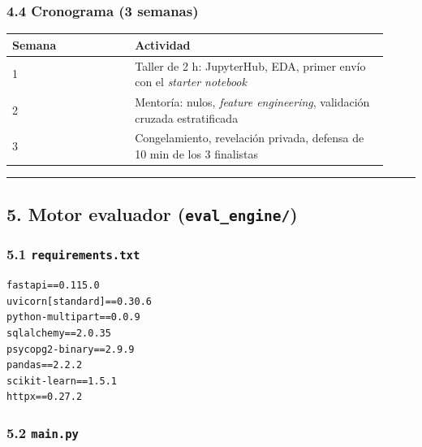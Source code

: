 \documentclass[11pt,a4paper]{article}
\begin{document}
\hypertarget{44-cronograma-3-semanas}{%
\subsubsection{4.4 Cronograma (3 semanas)}\label{44-cronograma-3-semanas}}

\begin{longtable}[]{@{}p{0.300\linewidth}p{0.620\linewidth}@{}}
\toprule
Semana & Actividad \\
\midrule
\endhead
1 & Taller de 2 h: JupyterHub, EDA, primer envío con el \emph{starter notebook} \\
2 & Mentoría: nulos, \emph{feature engineering}, validación cruzada estratificada \\
3 & Congelamiento, revelación privada, defensa de 10 min de los 3 finalistas \\
\bottomrule
\end{longtable}

\begin{center}\rule{0.5\linewidth}{0.5pt}\end{center}

\hypertarget{5-motor-evaluador-eval_engine}{%
\subsection{\texorpdfstring{5. Motor evaluador (\texttt{eval\_\allowbreak{}engine/\allowbreak{}})}{5. Motor evaluador (eval\_engine/)}}\label{5-motor-evaluador-eval_engine}}

\hypertarget{51-requirementstxt}{%
\subsubsection{\texorpdfstring{5.1 \texttt{requirements.\allowbreak{}txt}}{5.1 requirements.txt}}\label{51-requirementstxt}}

\begin{lstlisting}
fastapi==0.115.0
uvicorn[standard]==0.30.6
python-multipart==0.0.9
sqlalchemy==2.0.35
psycopg2-binary==2.9.9
pandas==2.2.2
scikit-learn==1.5.1
httpx==0.27.2
\end{lstlisting}

\hypertarget{52-mainpy}{%
\subsubsection{\texorpdfstring{5.2 \texttt{main.\allowbreak{}py}}{5.2 main.py}}\label{52-mainpy}}
\end{document}
